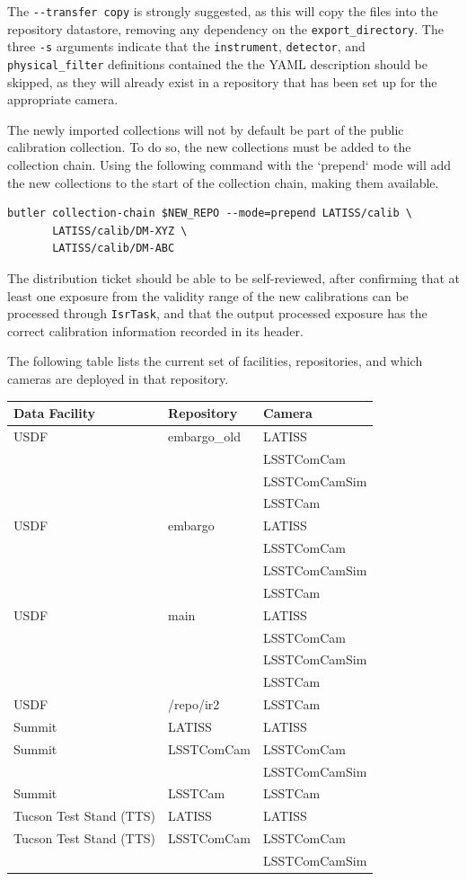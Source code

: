 \documentclass[DM,authoryear,toc]{lsstdoc}
\begin{document}
The \verb|--transfer copy| is strongly suggested, as this will copy the files into the repository datastore, removing any dependency on the \verb|export_directory|.
The three \verb|-s| arguments indicate that the \verb|instrument|, \verb|detector|, and \verb|physical_filter| definitions contained the the YAML description should be skipped, as they will already exist in a repository that has been set up for the appropriate camera.

The newly imported collections will not by default be part of the public calibration collection.
To do so, the new collections must be added to the collection chain.
Using the following command with the `prepend` mode will add the new collections to the start of the collection chain, making them available.
\begin{verbatim}
butler collection-chain $NEW_REPO --mode=prepend LATISS/calib \
       LATISS/calib/DM-XYZ \
       LATISS/calib/DM-ABC
\end{verbatim}
The distribution ticket should be able to be self-reviewed, after confirming that at least one exposure from the validity range of the new calibrations can be processed through \verb|IsrTask|, and that the output processed exposure has the correct calibration information recorded in its header.

The following table lists the current set of facilities, repositories, and which cameras are deployed in that repository.

\begin{tabular}{lll}
  Data Facility & Repository & Camera \\
  \hline
  USDF & embargo\_old & LATISS \\
  & & LSSTComCam \\
  & & LSSTComCamSim \\
  & & LSSTCam \\
  \hline
  USDF & embargo & LATISS \\
  & & LSSTComCam \\
  & & LSSTComCamSim \\
  & & LSSTCam \\
  \hline
  USDF & main & LATISS \\
  & & LSSTComCam \\
  & & LSSTComCamSim \\
  & & LSSTCam \\
  \hline
  USDF & /repo/ir2 & LSSTCam \\
  \hline
  Summit & LATISS & LATISS \\
  Summit & LSSTComCam & LSSTComCam \\
  & & LSSTComCamSim \\
  Summit & LSSTCam & LSSTCam \\
  \hline
  Tucson Test Stand (TTS) & LATISS & LATISS \\
  Tucson Test Stand (TTS) & LSSTComCam & LSSTComCam \\
  & & LSSTComCamSim \\
  \hline
\end{tabular}
\end{document}
